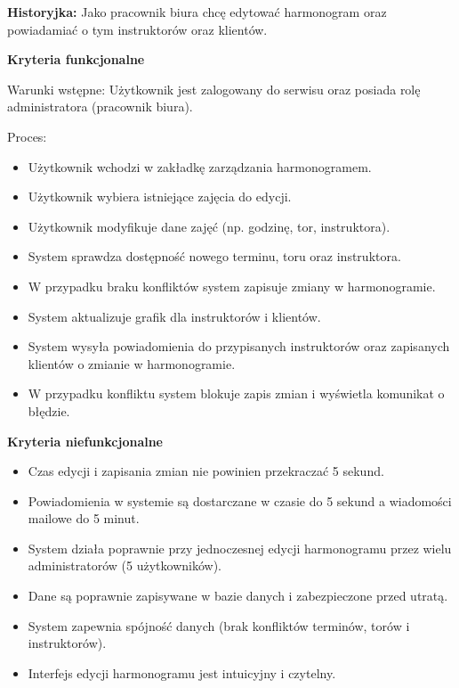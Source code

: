 \documentclass[a4paper,12pt]{article}
\begin{document}
\noindent \textbf{Historyjka:} Jako pracownik biura chcę edytować harmonogram oraz powiadamiać o tym instruktorów oraz klientów.

\vspace{0,2cm}

\noindent \textbf{Kryteria funkcjonalne}

\vspace{0,2cm}

\noindent Warunki wstępne: Użytkownik jest zalogowany do serwisu oraz posiada rolę administratora (pracownik biura).

\vspace{0,2cm}

\noindent Proces:

\begin{itemize}
    \item Użytkownik wchodzi w zakładkę zarządzania harmonogramem.
    \item Użytkownik wybiera istniejące zajęcia do edycji.
    \item Użytkownik modyfikuje dane zajęć (np. godzinę, tor, instruktora).
    \item System sprawdza dostępność nowego terminu, toru oraz instruktora.
    \item W przypadku braku konfliktów system zapisuje zmiany w harmonogramie.
    \item System aktualizuje grafik dla instruktorów i klientów.
    \item System wysyła powiadomienia do przypisanych instruktorów oraz zapisanych klientów o zmianie w harmonogramie.
    \item W przypadku konfliktu system blokuje zapis zmian i wyświetla komunikat o błędzie.
\end{itemize}

\noindent \textbf{Kryteria niefunkcjonalne}
\begin{itemize}
    \item Czas edycji i zapisania zmian nie powinien przekraczać 5 sekund.
    \item Powiadomienia w systemie są dostarczane w czasie do 5 sekund a wiadomości mailowe do 5 minut.
    \item System działa poprawnie przy jednoczesnej edycji harmonogramu przez wielu administratorów (5 użytkowników).
    \item Dane są poprawnie zapisywane w bazie danych i zabezpieczone przed utratą.
    \item System zapewnia spójność danych (brak konfliktów terminów, torów i instruktorów).
    \item Interfejs edycji harmonogramu jest intuicyjny i czytelny.
\end{itemize}
\end{document}
